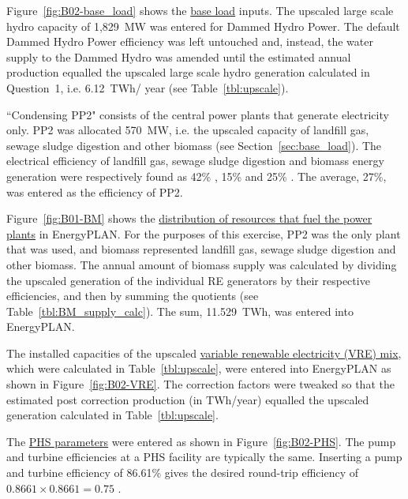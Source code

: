 Figure~\ref{fig:B02-base_load} shows the \underline{base load} inputs.
The upscaled large scale hydro capacity of 1,829~MW was entered for Dammed Hydro Power.
The default Dammed Hydro Power efficiency was left untouched and, instead, the water supply to the Dammed Hydro was amended until the estimated annual production equalled the upscaled large scale hydro generation calculated in Question~1, i.e. 6.12~TWh/ year (see Table~\ref{tbl:upscale}).



``Condensing PP2" consists of the central power plants that generate electricity only.
PP2 was allocated 570~MW, i.e. the upscaled capacity of landfill gas, sewage sludge digestion and other biomass (see Section~\ref{sec:base_load}).
The electrical efficiency of landfill gas, sewage sludge digestion and biomass energy generation were respectively found as 42\% \citep{ClarkeEnergy}, 15\% \citep{Mills2015} and 25\% \citep{BERC2009}.
The average, 27\%, was entered as the efficiency of PP2.

Figure~\ref{fig:B01-BM} shows the \underline{distribution of resources that fuel the power plants} in EnergyPLAN.
For the purposes of this exercise, PP2 was the only plant that was used, and biomass represented landfill gas, sewage sludge digestion and other biomass.
The annual amount of biomass supply was calculated by dividing the upscaled generation of the individual RE generators by their respective efficiencies, and then by summing the quotients (see Table~\ref{tbl:BM_supply_calc}).
The sum, 11.529~TWh, was entered into EnergyPLAN.



The installed capacities of the upscaled \underline{variable renewable electricity (VRE) mix}, which were calculated in Table~\ref{tbl:upscale}, were entered into EnergyPLAN as shown in Figure~\ref{fig:B02-VRE}.
The correction factors were tweaked so that the estimated post correction production (in TWh/year) equalled the upscaled generation calculated in Table~\ref{tbl:upscale}.

The \underline{PHS parameters}
were entered as shown in Figure~\ref{fig:B02-PHS}.
The pump and turbine efficiencies at a PHS facility are typically the same.
Inserting a pump and turbine efficiency of 86.61\% gives the desired round-trip efficiency of $0.8661 \times 0.8661 = 0.75$ \citep{Connolly2015}.


